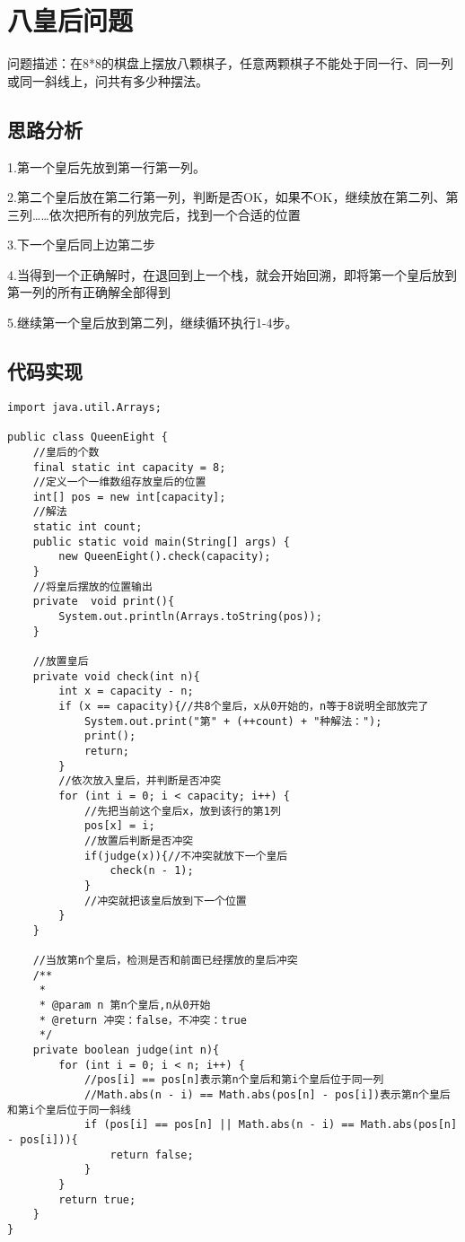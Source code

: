 \documentclass[a4paper]{report}
\begin{document}
\section{八皇后问题}

问题描述：在8*8的棋盘上摆放八颗棋子，任意两颗棋子不能处于同一行、同一列或同一斜线上，问共有多少种摆法。
\subsection{思路分析}
1.第一个皇后先放到第一行第一列。

2.第二个皇后放在第二行第一列，判断是否OK，如果不OK，继续放在第二列、第三列……依次把所有的列放完后，找到一个合适的位置

3.下一个皇后同上边第二步

4.当得到一个正确解时，在退回到上一个栈，就会开始回溯，即将第一个皇后放到第一列的所有正确解全部得到

5.继续第一个皇后放到第二列，继续循环执行1-4步。

\subsection{代码实现}
\begin{lstlisting}
import java.util.Arrays;

public class QueenEight {
    //皇后的个数
    final static int capacity = 8;
    //定义一个一维数组存放皇后的位置
    int[] pos = new int[capacity];
    //解法
    static int count;
    public static void main(String[] args) {
        new QueenEight().check(capacity);
    }
    //将皇后摆放的位置输出
    private  void print(){
        System.out.println(Arrays.toString(pos));
    }

    //放置皇后
    private void check(int n){
        int x = capacity - n;
        if (x == capacity){//共8个皇后，x从0开始的，n等于8说明全部放完了
            System.out.print("第" + (++count) + "种解法：");
            print();
            return;
        }
        //依次放入皇后，并判断是否冲突
        for (int i = 0; i < capacity; i++) {
            //先把当前这个皇后x，放到该行的第1列
            pos[x] = i;
            //放置后判断是否冲突
            if(judge(x)){//不冲突就放下一个皇后
                check(n - 1);
            }
            //冲突就把该皇后放到下一个位置
        }
    }

    //当放第n个皇后，检测是否和前面已经摆放的皇后冲突
    /**
     *
     * @param n 第n个皇后,n从0开始
     * @return 冲突：false，不冲突：true
     */
    private boolean judge(int n){
        for (int i = 0; i < n; i++) {
            //pos[i] == pos[n]表示第n个皇后和第i个皇后位于同一列
            //Math.abs(n - i) == Math.abs(pos[n] - pos[i])表示第n个皇后和第i个皇后位于同一斜线
            if (pos[i] == pos[n] || Math.abs(n - i) == Math.abs(pos[n] - pos[i])){
                return false;
            }
        }
        return true;
    }
}
\end{lstlisting}
\end{document}
